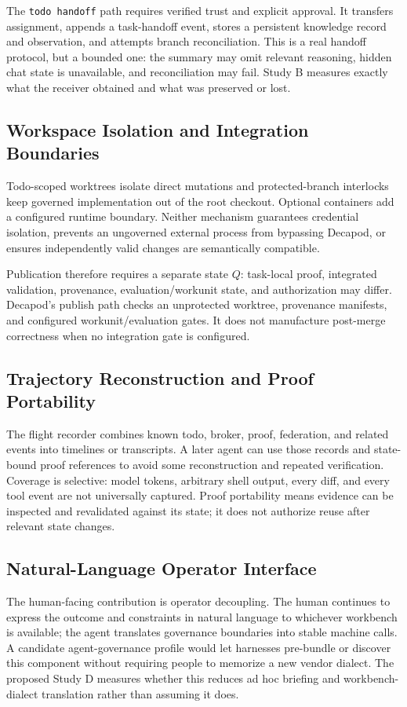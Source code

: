 The \texttt{todo handoff} path requires verified trust and explicit approval. It transfers assignment, appends a task-handoff event, stores a persistent knowledge record and observation, and attempts branch reconciliation. This is a real handoff protocol, but a bounded one: the summary may omit relevant reasoning, hidden chat state is unavailable, and reconciliation may fail. Study B measures exactly what the receiver obtained and what was preserved or lost.

\subsection{Workspace Isolation and Integration Boundaries}
Todo-scoped worktrees isolate direct mutations and protected-branch interlocks keep governed implementation out of the root checkout. Optional containers add a configured runtime boundary. Neither mechanism guarantees credential isolation, prevents an ungoverned external process from bypassing Decapod, or ensures independently valid changes are semantically compatible.

Publication therefore requires a separate state $Q$: task-local proof, integrated validation, provenance, evaluation/workunit state, and authorization may differ. Decapod's publish path checks an unprotected worktree, provenance manifests, and configured workunit/evaluation gates. It does not manufacture post-merge correctness when no integration gate is configured.

\subsection{Trajectory Reconstruction and Proof Portability}
The flight recorder combines known todo, broker, proof, federation, and related events into timelines or transcripts. A later agent can use those records and state-bound proof references to avoid some reconstruction and repeated verification. Coverage is selective: model tokens, arbitrary shell output, every diff, and every tool event are not universally captured. Proof portability means evidence can be inspected and revalidated against its state; it does not authorize reuse after relevant state changes.

\subsection{Natural-Language Operator Interface}
The human-facing contribution is operator decoupling. The human continues to express the outcome and constraints in natural language to whichever workbench is available; the agent translates governance boundaries into stable machine calls. A candidate agent-governance profile would let harnesses pre-bundle or discover this component without requiring people to memorize a new vendor dialect. The proposed Study D measures whether this reduces ad hoc briefing and workbench-dialect translation rather than assuming it does.

